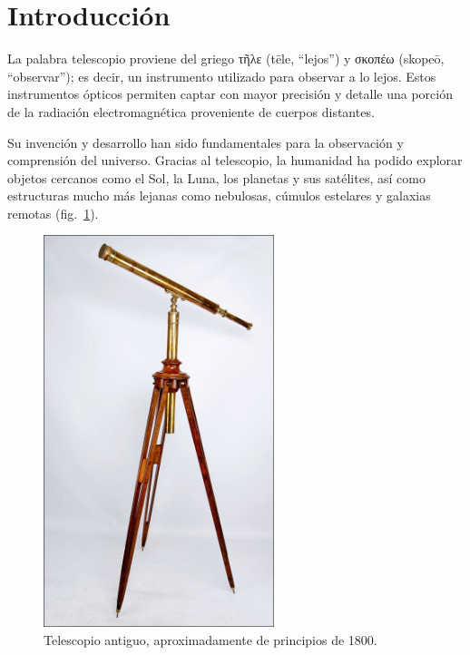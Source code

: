 
\section{Introducción}

La palabra telescopio proviene del griego \foreignlanguage{greek}{τῆλε} (tēle, “lejos”) y \foreignlanguage{greek}{σκοπέω} (skopeō, “observar”); es decir, un instrumento utilizado para observar a lo lejos. Estos instrumentos ópticos permiten captar con mayor precisión y detalle una porción de la radiación electromagnética proveniente de cuerpos distantes.

Su invención y desarrollo han sido fundamentales para la observación y comprensión del universo. Gracias al telescopio, la humanidad ha podido explorar objetos cercanos como el Sol, la Luna, los planetas y sus satélites, así como estructuras mucho más lejanas como nebulosas, cúmulos estelares y galaxias remotas (fig.~\ref{fig:telescopio_antiguo}).

\begin{figure}[H]
	\centering
	\includegraphics[width=0.6\textwidth]{images/telescopio_antiguo.jpg}
	\caption{Telescopio antiguo, aproximadamente de principios de 1800.}
	\label{fig:telescopio_antiguo}
\end{figure}

